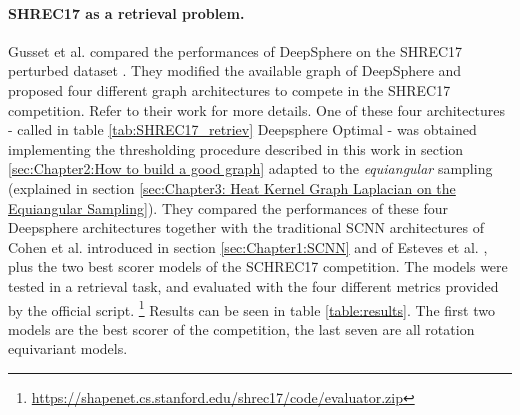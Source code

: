 \paragraph{SHREC17 as a retrieval problem.}
Gusset et al. \cite{Gusset} compared the performances of DeepSphere on the SHREC17 perturbed dataset \cite{SHREC17}. They modified the available graph of DeepSphere and proposed four different graph architectures to compete in the SHREC17 competition. Refer to their work for more details. One of these four architectures - called in table \ref{tab:SHREC17_retriev} Deepsphere Optimal - was obtained implementing the thresholding procedure described in this work in section \ref{sec:Chapter2:How to build a good graph} adapted to the \textit{equiangular} sampling (explained in section \ref{sec:Chapter3: Heat Kernel Graph Laplacian on the Equiangular Sampling}). They compared the performances of these four Deepsphere architectures together with the traditional SCNN architectures of Cohen et al. \cite{SCNN} introduced in section \ref{sec:Chapter1:SCNN} and of Esteves et al. \cite{Esteves}, plus the two best scorer models of the SCHREC17 competition. The models were tested in a retrieval task, and evaluated with the four different metrics provided by the official script. \footnote{\url{https://shapenet.cs.stanford.edu/shrec17/code/evaluator.zip}} Results can be seen in table \ref{table:results}.  The first two models are the best scorer of the competition, the last seven are all rotation equivariant models.

